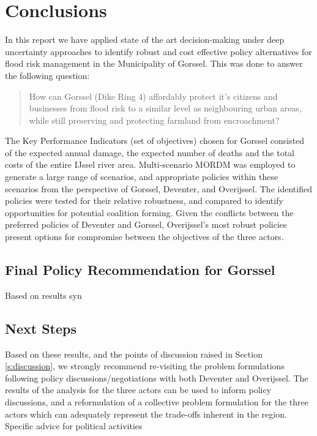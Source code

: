 \section{Conclusions}
\label{s:conc}


In this report we have applied state of the art decision-making under deep uncertainty approaches to identify robust and cost effective policy alternatives for flood risk management in the Municipality of Gorssel. This was done to answer the following question:
\begin{quote}
    How can Gorssel (Dike Ring 4) affordably protect it's citizens and businesses from flood risk to a similar level as neighbouring urban areas, while still preserving and protecting farmland from encroachment?
\end{quote} 

The Key Performance Indicators (set of objectives) chosen for Gorssel consisted of the expected annual damage, the expected number of deaths and the total costs of the entire IJssel river area. Multi-scenario MORDM was employed to generate a large range of scenarios, and appropriate policies within these scenarios from the perspective of Gorssel, Deventer, and Overijssel. The identified policies were tested for their relative robustness, and compared to identify opportunities for potential coalition forming. Given the conflicts between the preferred policies of Deventer and Gorssel, Overijssel's most robust policies present options for compromise between the objectives of the three actors.

\subsection{Final Policy Recommendation for Gorssel}

Based on results syn

\subsection{Next Steps}
Based on these results, and the points of discussion raised in Section \ref{s:discussion}, we strongly recommend re-visiting the problem formulations following policy discussions/negotiations with both Deventer and Overijssel. The results of the analysis for the three actors can be used to inform policy discussions, and a reformulation of a collective problem formulation for the three actors which can adequately represent the trade-offs inherent in the region. Specific advice for political activities 

